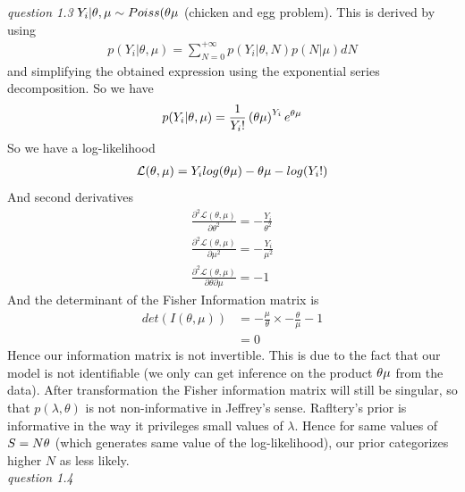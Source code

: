\documentclass[twoside]{article}
\begin{document}
\vspace{.2 in}
\textit{question 1.3} $Y_i | \theta, \mu \sim Poiss(\theta \* \mu$ (chicken and egg problem). This is derived by using
\begin{align*}
p(Y_i | \theta, \mu) = \sum_{N=0}^{+\infty} p(Y_i| \theta, N) p(N | \mu) dN
\end{align*}
and simplifying the obtained expression using the exponential series decomposition. So we have
\begin{align*}
p(Y_i | \theta, \mu) = \frac{1}{Y_i !} \left(\theta \* \mu \right)^{Y_i} \* e^{\theta \*\mu} 
\end{align*}
So we have a log-likelihood
\begin{align*}
\mathcal{L}(\theta, \mu) = Y_i \* log(\theta \* \mu) - \theta \* \mu -log(Y_i!)
\end{align*}
And second derivatives
\begin{align*}
\frac{\partial^2 \mathcal{L}(\theta, \mu)}{\partial \theta^2} = - \frac{Y_i}{\theta^2}\\
\frac{\partial^2 \mathcal{L}(\theta, \mu)}{\partial \mu^2} = - \frac{Y_i}{\mu^2}\\
\frac{\partial^2 \mathcal{L}(\theta, \mu)}{\partial \theta \partial \mu} = - 1
\end{align*}
And the determinant of the Fisher Information matrix is 
\begin{align*}
det(I(\theta, \mu)) & = -\frac{\mu}{\theta} \times - \frac{\theta}{\mu} - 1\\
& = 0
\end{align*}
Hence our information matrix is not invertible. This is due to the fact that our model is not identifiable (we only can get inference on the product $\theta \* \mu$ from the data). After transformation the Fisher information matrix will still be singular, so that $p(\lambda, \theta)$ is not non-informative in Jeffrey's sense. Rafltery's prior is informative in the way it privileges small values of $\lambda$. Hence for same values of $S = N \* \theta$ (which generates same value of the log-likelihood), our prior categorizes higher $N$ as less likely.\\


\vspace{.2 in}
\textit{question 1.4}
\end{document}

